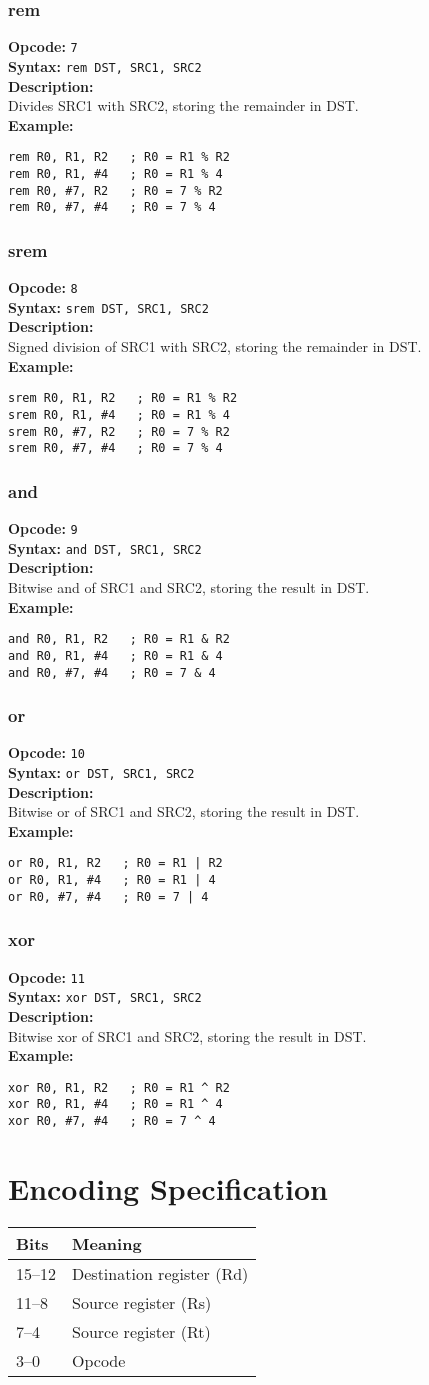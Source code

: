 \documentclass[a4paper,12pt]{article}
\newcommand{\syntax}[1]{
  \noindent\textbf{Syntax:} \texttt{#1}\\
}
\newcommand{\desc}[1]{
  \noindent\textbf{Description:}\\
  #1\\
  \noindent\textbf{Example:}}
\newenvironment{instruction}[2]{
  \subsubsection{#1}
  \noindent\textbf{Opcode:} \texttt{#2}\\}{}
\begin{document}
\begin{instruction}{rem}{7}
\syntax{rem DST, SRC1, SRC2}
\desc{Divides SRC1 with SRC2, storing the remainder in DST.}
\begin{verbatim}
rem R0, R1, R2   ; R0 = R1 % R2
rem R0, R1, #4   ; R0 = R1 % 4
rem R0, #7, R2   ; R0 = 7 % R2
rem R0, #7, #4   ; R0 = 7 % 4
\end{verbatim}
\end{instruction}

\begin{instruction}{srem}{8}
\syntax{srem DST, SRC1, SRC2}
\desc{Signed division of SRC1 with SRC2, storing the remainder in DST.}
\begin{verbatim}
srem R0, R1, R2   ; R0 = R1 % R2
srem R0, R1, #4   ; R0 = R1 % 4
srem R0, #7, R2   ; R0 = 7 % R2
srem R0, #7, #4   ; R0 = 7 % 4
\end{verbatim}
\end{instruction}

\begin{instruction}{and}{9}
\syntax{and DST, SRC1, SRC2}
\desc{Bitwise and of SRC1 and SRC2, storing the result in DST.}
\begin{verbatim}
and R0, R1, R2   ; R0 = R1 & R2
and R0, R1, #4   ; R0 = R1 & 4
and R0, #7, #4   ; R0 = 7 & 4
\end{verbatim}
\end{instruction}

\begin{instruction}{or}{10}
\syntax{or DST, SRC1, SRC2}
\desc{Bitwise or of SRC1 and SRC2, storing the result in DST.}
\begin{verbatim}
or R0, R1, R2   ; R0 = R1 | R2
or R0, R1, #4   ; R0 = R1 | 4
or R0, #7, #4   ; R0 = 7 | 4
\end{verbatim}
\end{instruction}

\begin{instruction}{xor}{11}
\syntax{xor DST, SRC1, SRC2}
\desc{Bitwise xor of SRC1 and SRC2, storing the result in DST.}
\begin{verbatim}
xor R0, R1, R2   ; R0 = R1 ^ R2
xor R0, R1, #4   ; R0 = R1 ^ 4
xor R0, #7, #4   ; R0 = 7 ^ 4
\end{verbatim}
\end{instruction}

\newpage
\section{Encoding Specification}
\begin{tabular}{@{}ll@{}}
\toprule
Bits & Meaning \\
\midrule
15--12 & Destination register (Rd) \\
11--8  & Source register (Rs) \\
7--4   & Source register (Rt) \\
3--0   & Opcode \\
\bottomrule
\end{tabular}
\end{document}
